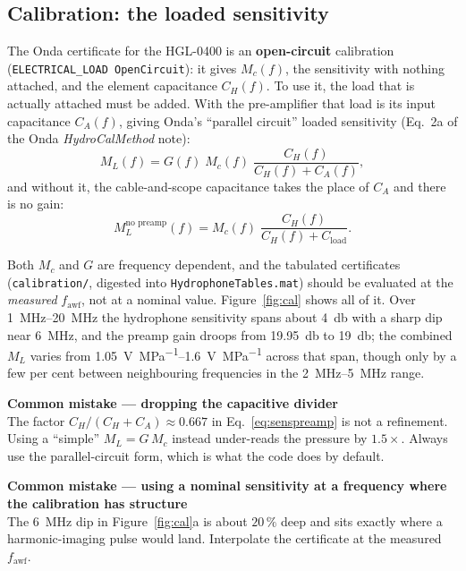 \documentclass[11pt,a4paper]{article}
\newcommand{\mistaketitle}[1]{\textcolor{orange!75!black}{\textbf{Common mistake --- #1}}\\[2pt]}
\begin{document}
\subsection{Calibration: the loaded sensitivity}\label{sec:calibration}
The Onda certificate for the HGL-0400 is an \textbf{open-circuit} calibration
(\texttt{ELECTRICAL\_LOAD OpenCircuit}): it gives $M_c(f)$, the sensitivity with nothing attached,
and the element capacitance $C_H(f)$. To use it, the load that is actually attached must be added.
With the pre-amplifier that load is its input capacitance $C_A(f)$, giving Onda's ``parallel
circuit'' loaded sensitivity (Eq.~2a of the Onda \emph{HydroCalMethod} note):
\begin{equation}
  M_L(f) = G(f)\; M_c(f)\;\frac{C_H(f)}{C_H(f)+C_A(f)} ,
  \label{eq:senspreamp}
\end{equation}
and without it, the cable-and-scope capacitance takes the place of $C_A$ and there is no gain:
\begin{equation}
  M_L^{\text{no preamp}}(f) = M_c(f)\;\frac{C_H(f)}{C_H(f)+C_\mathrm{load}} .
  \label{eq:sensnopreamp}
\end{equation}

Both $M_c$ and $G$ are frequency dependent, and the tabulated certificates
(\texttt{calibration/}, digested into \texttt{HydrophoneTables.mat}) should be evaluated at the
\emph{measured} $f_\mathrm{awf}$, not at a nominal value. Figure~\ref{fig:cal} shows all of it. Over
\SIrange{1}{20}{\mega\hertz} the hydrophone sensitivity spans about \SI{4}{\decibel} with a sharp dip
near \SI{6}{\mega\hertz}, and the preamp gain droops from \SI{19.95}{\decibel} to
\SI{19}{\decibel}; the combined $M_L$ varies from \SIrange{1.05}{1.6}{\volt\per\mega\pascal} across
that span, though only by a few per cent between neighbouring frequencies in the
\SIrange{2}{5}{\mega\hertz} range.

\begin{mistake}
\mistaketitle{dropping the capacitive divider}
The factor $C_H/(C_H+C_A)\approx0.667$ in Eq.~\ref{eq:senspreamp} is not a refinement. Using a
``simple'' $M_L=G\,M_c$ instead under-reads the pressure by $1.5\times$. Always use the
parallel-circuit form, which is what the code does by default.
\end{mistake}

\begin{mistake}
\mistaketitle{using a nominal sensitivity at a frequency where the calibration has structure}
The \SI{6}{\mega\hertz} dip in Figure~\ref{fig:cal}a is about $20\,\%$ deep and sits exactly where a
harmonic-imaging pulse would land. Interpolate the certificate at the measured $f_\mathrm{awf}$.
\end{mistake}
\end{document}
